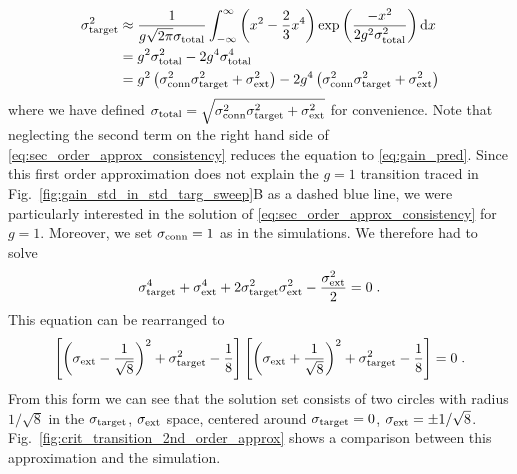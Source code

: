 \documentclass[10pt,a4paper]{article}
\begin{document}
\begin{align}
\sigma_{\rm target}^2 &\approx \frac{1}{g\sqrt{2 \pi}\sigma_{\rm total}}\int_{-\infty}^{\infty}\left( x^2 - \frac{2}{3}x^4\right)\exp\left( \frac{-x^2}{2g^2\sigma_{\rm total}^2}\right) \mathrm{d}x \\
&= g^2\sigma_{\rm total}^2 - 2g^4\sigma_{\rm total}^4 \\
&= g^2\left( \sigma^2_{\rm conn}\sigma^2_{\rm target} + \sigma^2_{\rm ext} \right) - 2g^4 \left( \sigma^2_{\rm conn}\sigma^2_{\rm target} + \sigma^2_{\rm ext} \right) \label{eq:sec_order_approx_consistency}
\end{align}
where we have defined $\sigma_{\rm total} = \sqrt{\sigma^2_{\rm conn}\sigma^2_{\rm target} + \sigma^2_{\rm ext}}$ for convenience. Note that neglecting the second term on the right hand side of \eqref{eq:sec_order_approx_consistency} reduces the equation to \eqref{eq:gain_pred}. Since this first order approximation does not explain the $g=1$ transition traced in Fig.~\ref{fig:gain_std_in_std_targ_sweep}B as a dashed blue line, we were particularly interested in the solution of \eqref{eq:sec_order_approx_consistency} for $g=1$. Moreover, we set $\sigma_{\rm conn}=1$ as in the simulations. We therefore had to solve
\begin{equation}
	\sigma_{\rm target}^4 + \sigma_{\rm ext}^4 + 2\sigma_{\rm target}^2\sigma_{\rm ext}^2 - \frac{\sigma_{\rm ext}^2}{2} = 0 \; .
\end{equation}
This equation can be rearranged to
\begin{equation}
	\left[\left(\sigma_{\rm ext} - \frac{1}{\sqrt{8}}\right)^2 + \sigma_{\rm target}^2 - \frac{1}{8}\right]\left[\left(\sigma_{\rm ext} + \frac{1}{\sqrt{8}}\right)^2 + \sigma_{\rm target}^2 - \frac{1}{8}\right] = 0 \; . \label{eq:circles_solution_form}
\end{equation}
From this form we can see that the solution set consists of two circles with radius $1/\sqrt{8}$ in the $\sigma_{\rm target}$, $\sigma_{\rm ext}$ space, centered around $\sigma_{\rm target} = 0$, $\sigma_{\rm ext} = \pm 1/\sqrt{8}$. Fig.~\ref{fig:crit_transition_2nd_order_approx} shows a comparison between this approximation and the simulation.
\end{document}
